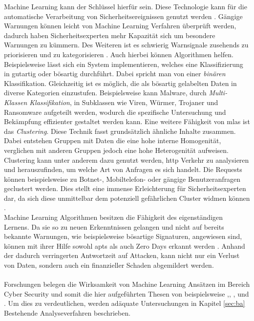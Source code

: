 \documentclass[
    12pt, %
    DIV10,
    ngerman, %
    a4paper, %
    oneside, %
    titlepage, %
    parskip=half, %
    headings=normal, %
    listof=totoc, %
    bibliography=totoc, %
    index=totoc, %
    captions=tableheading, %
    final %
]{scrreprt}
\begin{document}
Machine Learning kann der Schlüssel hierfür sein. Diese Technologie kann für die automatische Verarbeitung von Sicherheitsereignissen genutzt werden \parencite{Singla2019}. Gängige Warnungen können leicht von Machine Learning Verfahren überprüft werden, dadurch haben Sicherheitsexperten mehr Kapazität sich um besondere Warnungen zu kümmern. Des Weiteren ist es schwierig Warnsignale zusehends zu priorisieren und zu kategorisieren \parencite{JoshuaSaxe2018}. Auch hierbei können Algorithmen helfen. Beispielsweise lässt sich ein System implementieren, welches eine Klassifizierung in gutartig oder bösartig durchführt. Dabei spricht man von einer \emph{binären} Klassifikation. Gleichzeitig ist es möglich, die als bösartig gelabelten Daten in diverse Kategorien einzustufen. Beispielsweise kann Malware, durch \emph{Multi-Klassen Klassifikation}, in Subklassen wie Viren, Würmer, Trojaner und Ransomware aufgeteilt werden, wodurch die spezifische Untersuchung und Bekämpfung effizienter gestaltet werden kann.  Eine weitere Fähigkeit von \ac{mlas} ist das \emph{Clustering}. Diese Technik fasst grundsätzlich ähnliche Inhalte zusammen. Dabei entstehen Gruppen mit Daten die eine hohe interne Homogenität, verglichen mit anderen Gruppen jedoch eine hohe Heterogenität aufweisen. Clustering kann unter anderem dazu genutzt werden, \ac{http} Verkehr zu analysieren und herauszufinden, um welche Art von Anfragen es sich handelt. Die Requests können beispielsweise zu Botnet-, Mobiltelefon- oder gängige Benutzeranfragen geclustert werden. Dies stellt eine immense Erleichterung für Sicherheitsexperten dar, da sich diese unmittelbar dem potenziell gefährlichen Cluster widmen können \parencite{JoshuaSaxe2018}. \\Machine Learning Algorithmen besitzen die Fähigkeit des eigenständigen Lernens. Da sie so zu neuen Erkenntnissen gelangen und nicht auf bereits bekannte Warnungen, wie beispielsweise bösartige Signaturen, angewiesen sind, können mit ihrer Hilfe sowohl \ac{apts} als auch Zero Days erkannt werden \parencite{Hu2019}. Anhand der dadurch verringerten Antwortzeit auf Attacken, kann nicht nur ein Verlust von Daten, sondern auch ein finanzieller Schaden abgemildert werden.
\\\\
Forschungen belegen die Wirksamkeit von Machine Learning Ansätzen im Bereich Cyber Security und somit die hier aufgeführten Thesen von beispielsweise \textcite{Homoliak2019},\textcite{Jeong2019}, \textcite{Sabar2018}, \textcite{Brown2018} und \textcite{Yin2017}. Um dies zu verdeutlichen, werden adäquate Untersuchungen in Kapitel \ref{sec:ba} Bestehende Analyseverfahren beschrieben.
\end{document}

